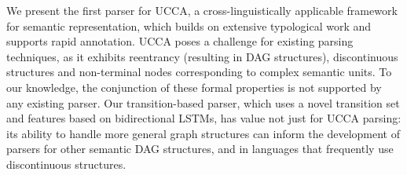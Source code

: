 We present the first parser for UCCA, a cross-linguistically applicable framework for semantic representation, which builds on extensive typological work and supports rapid annotation. UCCA poses a challenge for existing parsing techniques, as it exhibits reentrancy (resulting in DAG structures), discontinuous structures and non-terminal nodes corresponding to complex semantic units. To our knowledge, the conjunction of these formal properties is not supported by any existing parser. Our transition-based parser, which uses a novel transition set and features based on bidirectional LSTMs, has value not just for UCCA parsing: its ability to handle more general graph structures can inform the development of parsers for other semantic DAG structures, and in languages that frequently use discontinuous structures.
